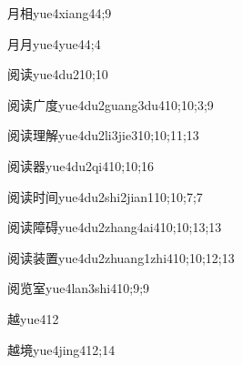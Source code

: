 \begin{verbete}{月相}{yue4xiang4}{4;9}
\end{verbete}

\begin{verbete}{月月}{yue4yue4}{4;4}
\end{verbete}

\begin{verbete}{阅读}{yue4du2}{10;10}
\end{verbete}

\begin{verbete}{阅读广度}{yue4du2guang3du4}{10;10;3;9}
\end{verbete}

\begin{verbete}{阅读理解}{yue4du2li3jie3}{10;10;11;13}
\end{verbete}

\begin{verbete}{阅读器}{yue4du2qi4}{10;10;16}
\end{verbete}

\begin{verbete}{阅读时间}{yue4du2shi2jian1}{10;10;7;7}
\end{verbete}

\begin{verbete}{阅读障碍}{yue4du2zhang4ai4}{10;10;13;13}
\end{verbete}

\begin{verbete}{阅读装置}{yue4du2zhuang1zhi4}{10;10;12;13}
\end{verbete}

\begin{verbete}{阅览室}{yue4lan3shi4}{10;9;9}
\end{verbete}

\begin{verbete}{越}{yue4}{12}
\end{verbete}

\begin{verbete}{越境}{yue4jing4}{12;14}
\end{verbete}

